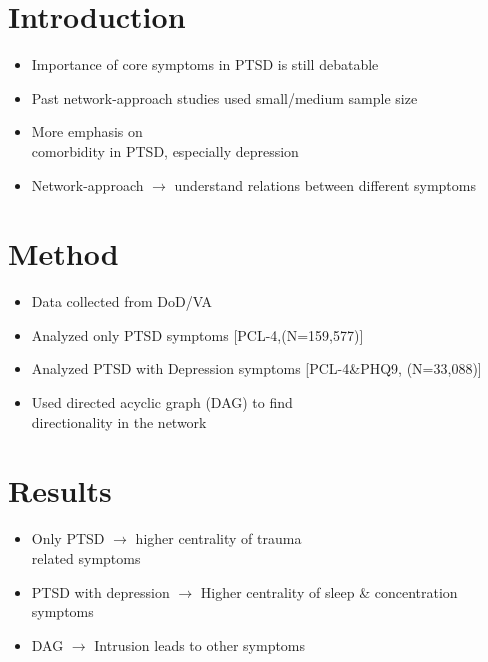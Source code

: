 \documentclass[]{betterposter}
\begin{document}
{

\section{Introduction}
\begin{itemize}
\item Importance of core symptoms in PTSD is still debatable
\item Past network-approach studies used small/medium sample size
\item More emphasis on\\ comorbidity in PTSD, especially depression
\item Network-approach $\rightarrow$ understand relations between different symptoms
\end{itemize}

\section{Method}
\begin{itemize}
\item Data collected from DoD/VA
\item Analyzed only PTSD symptoms [PCL-4,(N=159,577)]
\item Analyzed PTSD with Depression symptoms [PCL-4\&PHQ9, (N=33,088)]
\item Used directed acyclic graph (DAG) to find \\directionality in the network
\end{itemize}


\section{Results}
\begin{itemize}
    \item Only PTSD $\rightarrow$ higher centrality of trauma\\ related symptoms
    \item PTSD with depression $\rightarrow$ Higher centrality of sleep \& concentration symptoms
    \item DAG $\rightarrow$ Intrusion leads to other symptoms
\end{itemize}

}
\end{document}
